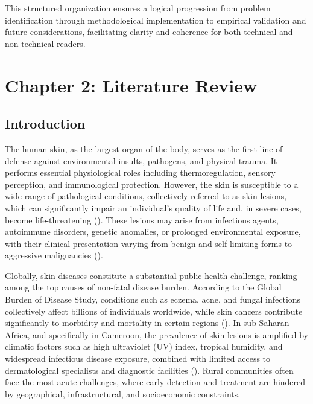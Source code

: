 \documentclass[
  12pt,
  oneside]{article}
\begin{document}
This structured organization ensures a logical progression from problem
identification through methodological implementation to empirical
validation and future considerations, facilitating clarity and coherence
for both technical and non-technical readers.

\newpage

\section{Chapter 2: Literature
Review}\label{chapter-2-literature-review}

\subsection{Introduction}\label{introduction-1}

The human skin, as the largest organ of the body, serves as the first
line of defense against environmental insults, pathogens, and physical
trauma. It performs essential physiological roles including
thermoregulation, sensory perception, and immunological protection.
However, the skin is susceptible to a wide range of pathological
conditions, collectively referred to as skin lesions, which can
significantly impair an individual's quality of life and, in severe
cases, become life-threatening (). These lesions may arise from infectious agents, autoimmune
disorders, genetic anomalies, or prolonged environmental exposure, with
their clinical presentation varying from benign and self-limiting forms
to aggressive malignancies ().

Globally, skin diseases constitute a substantial public health
challenge, ranking among the top causes of non-fatal disease burden.
According to the Global Burden of Disease Study, conditions such as
eczema, acne, and fungal infections collectively affect billions of
individuals worldwide, while skin cancers contribute significantly to
morbidity and mortality in certain regions
(). In sub-Saharan
Africa, and specifically in Cameroon, the prevalence of skin lesions is
amplified by climatic factors such as high ultraviolet (UV) index,
tropical humidity, and widespread infectious disease exposure, combined
with limited access to dermatological specialists and diagnostic
facilities (). Rural
communities often face the most acute challenges, where early detection
and treatment are hindered by geographical, infrastructural, and
socioeconomic constraints.
\end{document}
